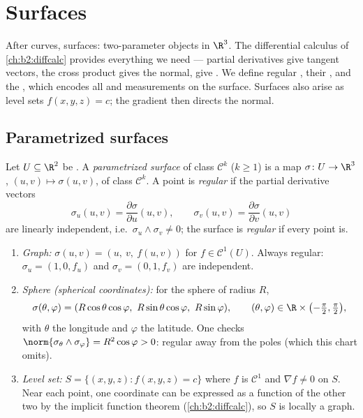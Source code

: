 \chapter{Surfaces}\label{ch:b2:surfaces}

After curves, surfaces: two-parameter objects in $\R^3$. The
differential calculus of \cref{ch:b2:diffcalc} provides everything
we need --- partial derivatives give tangent vectors, the cross
product gives the normal,  give . We define
regular , their , and the
\emph{}, which encodes all  and 
measurements on the surface. Surfaces also arise as level sets
$f(x, y, z) = c$; the gradient then directs the normal.

\section{Parametrized surfaces}

\begin{definition}\label{def:b2:surfaces:param}
Let $U \subseteq \R^2$ be . A \emph{parametrized
surface} of
class $\mathcal{C}^k$ ($k \geq 1$) is a map $\sigma \colon U \to
\R^3$, $(u, v) \mapsto \sigma(u, v)$, of class $\mathcal{C}^k$. A
point is \emph{regular} if the partial derivative vectors
\[
\sigma_u(u, v) = \frac{\partial\sigma}{\partial u}(u,v),
\qquad
\sigma_v(u, v) = \frac{\partial\sigma}{\partial v}(u,v)
\]
are linearly independent, i.e.\ $\sigma_u \wedge \sigma_v \neq 0$;
the surface is \emph{regular} if every point is.
\end{definition}

\begin{example}\label{ex:b2:surfaces:standard}
\leavevmode
\begin{enumerate}
\item \emph{Graph:} $\sigma(u, v) = (u,\ v,\ f(u, v))$ for $f \in
\mathcal{C}^1(U)$. Always regular: $\sigma_u = (1, 0, f_u)$ and
$\sigma_v = (0, 1, f_v)$ are independent.
\item \emph{Sphere (spherical coordinates):} for the sphere of
radius $R$,
\[
\sigma(\theta, \varphi)
= (R\cos\theta\cos\varphi,\ R\sin\theta\cos\varphi,\
R\sin\varphi),
\qquad
(\theta, \varphi) \in \R \times
\bigl(-\tfrac\pi2, \tfrac\pi2\bigr),
\]
with $\theta$ the longitude and $\varphi$ the latitude. One checks
$\norm{\sigma_\theta \wedge \sigma_\varphi} = R^2\cos\varphi > 0$:
regular away from the poles (which this chart omits).
\item \emph{Level set:} $S = \{(x,y,z) : f(x, y, z) = c\}$ where
$f$ is $\mathcal{C}^1$ and $\nabla f \neq 0$ on $S$. Near each
point, one coordinate can be expressed as a function of the other
two by the implicit function theorem (\cref{ch:b2:diffcalc}), so
$S$ is locally a graph.
\end{enumerate}
\end{example}

